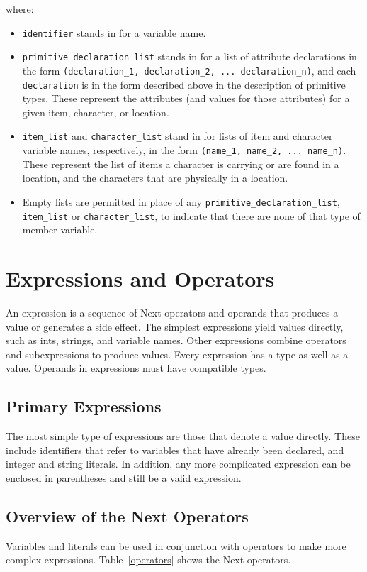 \documentclass[12pt]{article}
\begin{document}
\noindent where:
\begin{itemize}
\item \texttt{identifier} stands in for a variable name.
\item \texttt{primitive\_declaration\_list} stands in for a list of attribute declarations in the form \texttt{(declaration\_1, declaration\_2, ... declaration\_n)}, and each \texttt{declaration} is in the form described above in the description of primitive types.  These represent the attributes (and values for those attributes) for a given item, character, or location.
\item \texttt{item\_list} and \texttt{character\_list} stand in for lists of item and character variable names, respectively, in the form \texttt{(name\_1, name\_2, ... name\_n)}.  These represent the list of items a character is carrying or are found in a location, and the characters that are physically in a location.
\item Empty lists are permitted in place of any \texttt{primitive\_declaration\_list}, \texttt{item\_list} or \texttt{character\_list}, to indicate that there are none of that type of member variable.
\end{itemize}

\section{Expressions and Operators}
An expression is a sequence of Next operators and operands that produces a value or generates a side effect.  The simplest expressions yield values directly, such as ints, strings, and variable names.  Other expressions combine operators and subexpressions to produce values.  Every expression has a type as well as a value.  Operands in expressions must have compatible types.

\subsection{Primary Expressions}
The most simple type of expressions are those that denote a value directly.  These include identifiers that refer to variables that have already been declared, and integer and string literals.  In addition, any more complicated expression can be enclosed in parentheses and still be a valid expression.

\subsection{Overview of the Next Operators}
Variables and literals can be used in conjunction with operators to make more complex expressions.  Table~\ref{operators} shows the Next operators. \\
\end{document}
